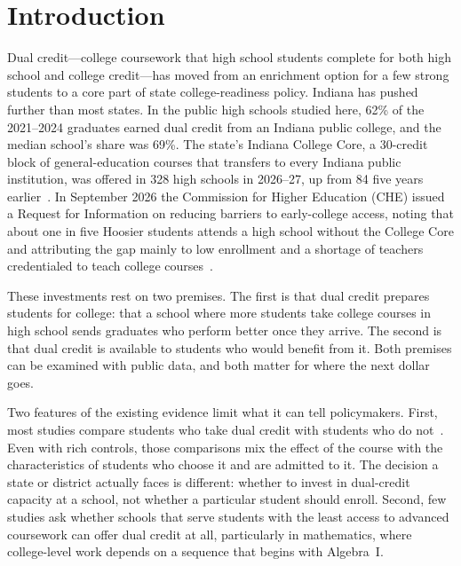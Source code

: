 \documentclass[aps,prd,reprint,superscriptaddress,nofootinbib,floatfix]{revtex4-2}
\begin{document}
\maketitle

\section{Introduction}\label{sec:intro}

Dual credit---college coursework that high school students complete for both high school and college credit---has moved from an enrichment option for a few strong students to a core part of state college-readiness policy. Indiana has pushed further than most states. In the public high schools studied here, 62\% of the 2021--2024 graduates earned dual credit from an Indiana public college, and the median school's share was 69\%. The state's Indiana College Core, a 30-credit block of general-education courses that transfers to every Indiana public institution, was offered in 328 high schools in 2026--27, up from 84 five years earlier~\cite{cherelease}. In September 2026 the Commission for Higher Education (CHE) issued a Request for Information on reducing barriers to early-college access, noting that about one in five Hoosier students attends a high school without the College Core and attributing the gap mainly to low enrollment and a shortage of teachers credentialed to teach college courses~\cite{icc}.

These investments rest on two premises. The first is that dual credit prepares students for college: that a school where more students take college courses in high school sends graduates who perform better once they arrive. The second is that dual credit is available to students who would benefit from it. Both premises can be examined with public data, and both matter for where the next dollar goes.

Two features of the existing evidence limit what it can tell policymakers. First, most studies compare students who take dual credit with students who do not~\cite{an2013,karp2007,speroni2011,giani2014}. Even with rich controls, those comparisons mix the effect of the course with the characteristics of students who choose it and are admitted to it. The decision a state or district actually faces is different: whether to invest in dual-credit capacity at a school, not whether a particular student should enroll. Second, few studies ask whether schools that serve students with the least access to advanced coursework can offer dual credit at all, particularly in mathematics, where college-level work depends on a sequence that begins with Algebra~I.
\end{document}
